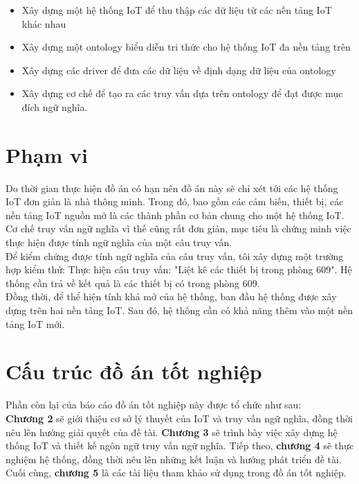 \begin{itemize}
	\item Xây dựng một hệ thống IoT để thu thập các dữ liệu từ các nền tảng IoT khác nhau
	\item Xây dựng một ontology biểu diễn tri thức cho hệ thống IoT đa nền tảng trên
	\item Xây dựng các driver để đưa các dữ liệu về định dạng dữ liệu của ontology
	\item Xây dựng cơ chế để tạo ra các truy vấn dựa trên ontology để đạt được mục đích ngữ nghĩa.
\end{itemize}

\section{Phạm vi}
Do thời gian thực hiện đồ án có hạn nên đồ án này sẽ chỉ xét tới các hệ thống IoT đơn giản là nhà thông minh. Trong đó, bao gồm các cảm biến, thiết bị, các nền tảng IoT nguồn mở là các thành phần cơ bản chung cho một hệ thống IoT. Cơ chế truy vấn ngữ nghĩa vì thế cũng rất đơn giản, mục tiêu là chứng minh việc thực hiện được tính ngữ nghĩa của một câu truy vấn.\\

Để kiểm chứng được tính ngữ nghĩa của câu truy vấn, tôi xây dựng một trường hợp kiểm thử:
Thực hiện câu truy vấn: "Liệt kê các thiết bị trong phòng 609". Hệ thống cần trả về kết quả là các thiết bị có trong phòng 609. \\
Đồng thời, để thể hiện tính khả mở của hệ thống, ban đầu hệ thống được xây dựng trên hai nền tảng IoT. Sau đó, hệ thống cần có khả năng thêm vào một nền tảng IoT mới.


\section{Cấu trúc đồ án tốt nghiệp}
Phần còn lại của báo cáo đồ án tốt nghiệp này được tổ chức như sau:\\
\textbf{Chương 2} sẽ giới thiệu cơ sở lý thuyết của IoT và truy vấn ngữ nghĩa, đồng thời nêu lên hướng giải quyết của đề tài. \textbf{Chương 3} sẽ trình bày việc xây dựng hệ thống IoT và thiết kế ngôn ngữ truy vấn ngữ nghĩa. Tiếp theo, \textbf{chương 4} sẽ thực nghiệm hệ thống, đồng thời nêu lên những kết luận và hướng phát triển đề tài. Cuối cùng, \textbf{chương 5} là các tài liệu tham khảo sử dụng trong đồ án tốt nghiệp.
 

